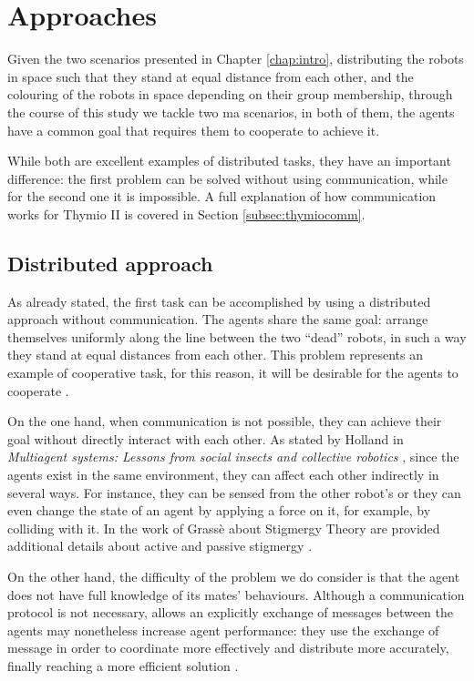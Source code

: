 \section{Approaches}
\label{sec:approaches}
Given the two scenarios presented in Chapter \ref{chap:intro}, distributing the 
robots in space such that they stand at equal distance from each other, and the 
colouring of the robots in space depending on their group membership, through 
the course of this study we tackle two \gls{ma} scenarios, in both of them, the 
agents have a common goal that requires them to cooperate to achieve it. 

While both are excellent examples of distributed tasks, they have an important 
difference: the first problem can be solved without using communication, while 
for the second one it is impossible.
A full explanation of how communication works for Thymio II is covered in 
Section \ref{subsec:thymiocomm}.

\subsection{Distributed approach}
\label{subsec:dist}

As already stated, the first task can be accomplished by using a distributed 
approach without communication.
The agents share the same goal: arrange themselves uniformly along the line 
between the two “dead” robots, in such a way they stand at equal distances from 
each other.
This problem represents an example of cooperative task, for this reason, it will be 
desirable for the agents to cooperate \cite[][]{barrett2017making}. 

On the one hand, when communication is not possible, they can achieve their 
goal without directly interact with each other. 
As stated by Holland in \emph{Multiagent systems: Lessons from social insects and 
collective robotics} \cite[][]{holland1996multiagent}, since the agents exist in the 
same environment, they can affect each other indirectly in several ways.
For instance, they can be sensed from the other robot’s or they can even change 
the state of an agent by applying a force on it, for example, by colliding with it.
In the work of Grassè about Stigmergy Theory are provided additional details 
about active and passive stigmergy \cite[][]{grasse1959reconstruction}.

On the other hand, the difficulty of the problem we do consider is that the agent 
does not have full knowledge of its mates’ behaviours.
Although a communication protocol is not necessary, allows an explicitly 
exchange of messages between the agents may nonetheless increase agent 
performance: they use the exchange of message in order to coordinate more 
effectively and distribute more accurately, finally reaching a more efficient 
solution \cite{panait2005cooperative}.


